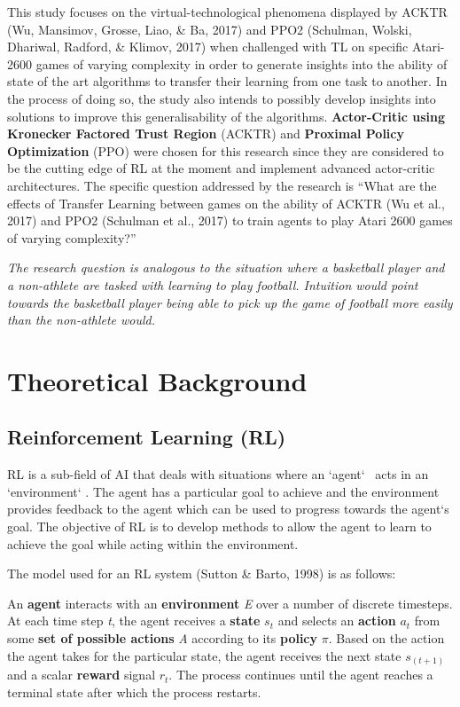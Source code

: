 This study focuses on the virtual-technological phenomena displayed by ACKTR (Wu, Mansimov, Grosse, Liao, \& Ba, 2017) and PPO2 (Schulman, Wolski, Dhariwal, Radford, \& Klimov, 2017) when challenged with TL on specific Atari-2600 games of varying complexity in order to generate insights into the ability of state of the art algorithms to transfer their learning from one task to another. In the process of doing so, the study also intends to possibly develop insights into solutions to improve this generalisability of the algorithms. \textbf{Actor-Critic using Kronecker Factored Trust Region} (ACKTR) and \textbf{Proximal Policy Optimization} (PPO) were chosen for this research since they are considered to be the cutting edge of RL at the moment and implement advanced actor-critic architectures. The specific question addressed by the research is ``What are the effects of Transfer Learning between games on the ability of ACKTR (Wu et al., 2017) and PPO2 (Schulman et al., 2017) to train agents to play Atari 2600 games of varying complexity?''

\textit{The research question is analogous to the situation where a basketball player and a non-athlete are tasked with learning to play football. Intuition would point towards the basketball player being able to pick up the game of football more easily than the non-athlete would.}


\section{Theoretical Background}

\subsection*{Reinforcement Learning (RL)}
RL is a sub-field of AI that deals with situations where an `agent` \ acts in an `environment` . The agent has a particular goal to achieve and the environment provides feedback to the agent which can be used to progress towards the agent`s goal. The objective of RL is to develop methods to allow the agent to learn to achieve the goal while acting within the environment. 

The model used for an RL system (Sutton \& Barto, 1998) is as follows: 

An \textbf{agent} interacts with an \textbf{environment} \textit{E} over a number of discrete timesteps. At each time step \textit{t}, the agent receives a \textbf{state} $s_{t}$ and selects an \textbf{action} $a_{t}$ from some\textbf{ set of possible actions} \textit{A} according to its \textbf{policy} $\pi$. Based on the action the agent takes for the particular state, the agent receives the next state $s_{(t+1)}$ and a scalar \textbf{reward} signal $r_{t}$. The process continues until the agent reaches a terminal state after which the process restarts. 

